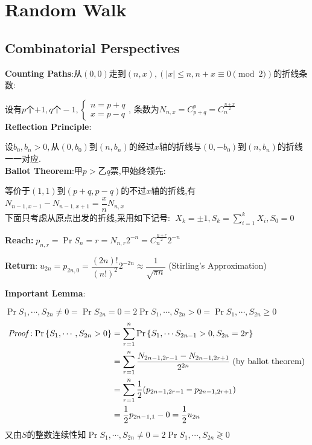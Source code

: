 
\section{Random Walk}
\subsection{Combinatorial Perspectives}
\label{sec:walk}
\textbf{Counting Paths}:从$ (0,0)走到 (n,x),(|x|\le n, n + x\equiv 0 \pmod 2)$的折线条数:

  设有$ p$个$ +1,q个-1,\begin{cases}n=p+q\\x=p-q \end{cases}$,
  条数为$ N_{n,x} = C_{p+q}^p = C_{n}^{\frac{n+x}{2}}$
  \\

  \textbf{Reflection Principle}:

  设$ b_0,b_n>0,从(0,b_0)到(n,b_n)$的经过$ x$轴的折线与$(0,-b_0)$到$(n,b_n)$的折线一一对应.
  \\

  \textbf{Ballot Theorem}:甲$ p>$乙$ q$票,甲始终领先:

  等价于$ (1,1)$到$ (p+q,p-q)$的不过$ x$轴的折线,有$ N_{n-1,x-1} -
  N_{n-1,x+1}=\dfrac{x}{n}N_{n,x}$
  \\

  下面只考虑从原点出发的折线,采用如下记号:
  $\; X_k = \pm 1, S_k = \sum_{i=1}^k{X_i},S_0=0$

  \textbf{Reach:}$\; p_{n,r} = \Pr{S_n=r} = N_{n,r}2^{-n} = C_{n}^{\frac{n+r}{2}}2^{-n}$

  \textbf{Return}:$\; u_{2n} = p_{2n,0} = \dfrac{(2n)!}{(n!)^2}2^{-2n}\approx \dfrac{1}{\sqrt{\pi n}}$ (Stirling's Approximation)
  \vspace{0.6cm}

  \textbf{Important Lemma}:

  $ \Pr{S_1,\cdots ,S_{2n}\neq 0} = \Pr{S_{2n}=0}=2\Pr{S_1,\cdots ,S_{2n}>0} =
    \Pr{S_1,\cdots ,S_{2n}\ge 0}$
\begin{align*}
  \proof:
   \Pr{S_1,\cdots ,S_{2n}>0} &= \sum_{r=1}^{n}{\Pr{S_1 ,\cdots S_{2n-1}>0,S_{2n}=2r}}\\
   &=\sum_{r=1}^{n}{\dfrac{N_{2n-1,2r-1}-N_{2n-1,2r+1}}{2^{2n}}} \; \text{(by ballot theorem)}\\
   &=\sum_{r=1}^n{\dfrac{1}{2}(p_{2n-1,2r-1}-p_{2n-1,2r+1})} \\
   &=\dfrac{1}{2}p_{2n-1,1}-0 = \dfrac{1}{2}u_{2n}
\end{align*}
又由$ S$的整数连续性知$ \Pr{S_1,\cdots ,S_{2n}\neq0}=2\Pr{S_1,\cdots ,S_{2n}\gtrless 0}$

